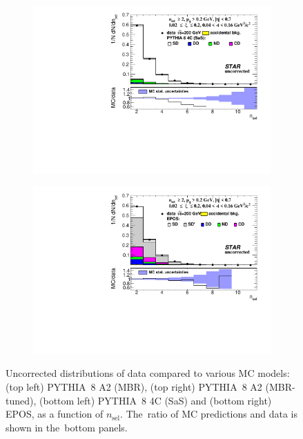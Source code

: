 \begin{figure}[t!]
\begin{subfigure}{.49\textwidth}
		\includegraphics[width=\linewidth, page=1]{chapters/chrgSTAR/img/nonSD/SDT_pythia_xi0_sas_RP_starsim_nsel.pdf}
	\end{subfigure}
	\begin{subfigure}{.49\textwidth}
		\includegraphics[width=\linewidth, page=1]{chapters/chrgSTAR/img/nonSD/chrg/SDT_epos_xi0_RP_starsim_nsel.pdf}
	\end{subfigure}
	\caption{Uncorrected distributions of data compared to various MC models: (top left) PYTHIA~8 A2 (MBR), (top right) PYTHIA~8 A2 (MBR-tuned), (bottom left) PYTHIA~8 4C (SaS) and (bottom right) EPOS, as a function of $n_{\mathrm{sel}}$. The~ratio of MC predictions and data is shown in the~bottom panels.}
	\label{fig:nonSDnsel}
	

\end{figure}

